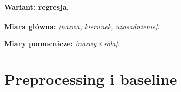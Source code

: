 \documentclass[10pt,twocolumn,a4paper]{article}
\newif\ifwskazowki
\newcommand{\wskazowka}[1]{\ifwskazowki
  \par\begingroup\small\color{black!72}\raggedright#1\par\endgroup\fi}
\newcommand{\pole}[1]{\textit{[#1]}}
\begin{document}
\paragraph{Wariant: regresja.}
\wskazowka{Uzasadnij MAE, RMSE lub inne kryterium i podaj jednostkę.
MAE/RMSE mają jednostkę celu, MSE jednostkę kwadratową, R$^2$ może być
ujemne.}

\noindent\textbf{Miara główna:} \pole{nazwa, kierunek, uzasadnienie}.

\noindent\textbf{Miary pomocnicze:} \pole{nazwy i rola}.

\section{Preprocessing i baseline}
\wskazowka{Opisz rzeczywiście użyte imputacje, kodowanie, skalowanie,
filtrowanie lub transformację. Podaj kolejność i miejsce
dopasowania każdego etapu oraz uzasadnienie dla wybranych modeli.
Nie usuwaj trudnych przykładów z validation/test w celu poprawy wyniku ani innych rekordów bez jasnego uzasadnienia}

\wskazowka{Zdefiniuj prosty baseline}

\FloatBarrier
\clearpage


\end{document}
